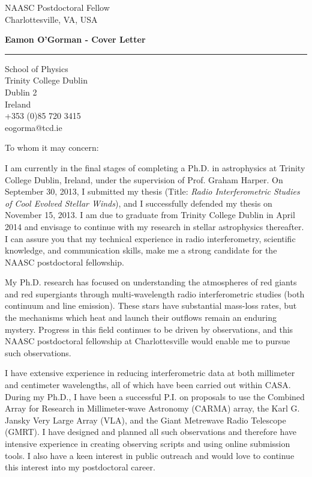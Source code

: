 \documentclass[10pt]{letter} %
\begin{document}
\longindentation=0pt                       %
\let\raggedleft\raggedright                %
 
\begin{letter}{NAASC Postdoctoral Fellow \\
Charlottesville, VA, USA \\
}

\begin{flushleft}
{\large\bf Eamon O'Gorman - Cover Letter}
\end{flushleft}
\medskip\hrule height 1pt
\begin{flushright}
\hfill School of Physics \\
\hfill Trinity College Dublin \\
\hfill Dublin 2 \\
\hfill Ireland \\
\hfill +353 (0)85 720 3415 \\
\hfill eogorma@tcd.ie \\

\end{flushright} 
\vfill %

\opening{To whom it may concern:} 

 
\noindent I am currently in the final stages of completing a Ph.D. in astrophysics at Trinity College Dublin, Ireland, under the supervision of Prof. Graham Harper. On September 30, 2013, I submitted my thesis (Title: \textit{Radio Interferometric Studies of Cool Evolved Stellar Winds}), and I successfully defended my thesis on November 15, 2013. I am due to graduate from Trinity College Dublin in April 2014 and envisage to continue with my research in stellar astrophysics thereafter. I can assure you that my technical experience in radio interferometry, scientific knowledge, and communication skills, make me a strong candidate for the NAASC postdoctoral fellowship.

\noindent My Ph.D. research has focused on understanding the atmospheres of red giants and red supergiants through multi-wavelength radio interferometric studies (both continuum and line emission). These stars have substantial mass-loss rates, but the mechanisms which heat and launch their outflows remain an enduring mystery. Progress in this field continues to be driven by observations, and this NAASC postdoctoral fellowship at Charlottesville would enable me to pursue such observations. 

\noindent I have extensive experience in reducing interferometric data at both millimeter and centimeter wavelengths, all of which have been carried out within CASA. During my Ph.D., I have been a successful P.I. on proposals to use the Combined Array for Research in Millimeter-wave Astronomy (CARMA) array, the Karl G. Jansky Very Large Array (VLA), and the Giant Metrewave Radio Telescope (GMRT). I have designed and planned all such observations and therefore have intensive experience in creating observing scripts and using online submission tools. I also have a keen interest in public outreach and would love to continue this interest into my postdoctoral career.


\end{letter}
\end{document}
